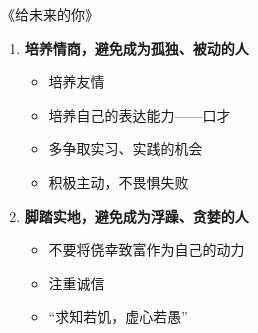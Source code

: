 \begin{frame}[<+->]{《给未来的你》}
	\linespread{1.4}
	\begin{enumerate}
	  \addtocounter{enumi}{2}
	  \item {\bf 培养情商，避免成为孤独、被动的人}
	  \begin{itemize}
	    \item 培养\alert{友情}
	    \item 培养自己的表达能力——\alert{口才}
	    \item 多争取\alert{实习、实践}的机会
	    \item 积极主动，不畏惧失败
	  \end{itemize}
	  \item {\bf 脚踏实地，避免成为浮躁、贪婪的人}
	  \begin{itemize}
	    \item 不要将侥幸致富作为自己的动力
	    \item 注重\alert{诚信}
	    \item \alert{“求知若饥，虚心若愚”}
	  \end{itemize}
	\end{enumerate}
\end{frame}


